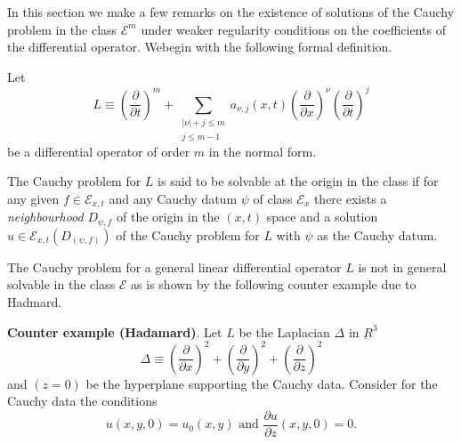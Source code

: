 In this section we make a few remarks on the existence of solutions of
the Cauchy problem in the  class $\mathscr{E}^m$ under weaker
regularity conditions on the coefficients of the differential
operator. We\pageoriginale begin with the following formal definition. 

Let
\begin{equation}
L\equiv \left(\frac{\partial}{\partial t}\right)^m + \sum_{\substack{|\nu |+ j
    \leq m\\ j \leq m-1}}  a_{\nu,  j}(x,  t)\left(\frac{\partial}{\partial
  x}\right)^\nu \left(\frac{\partial}{\partial t}\right)^j
\tag{4.1}\label{chap1-eq4.1}  
\end{equation}
be a differential operator of order $m$ in the normal form. 

\begin{defi*}
The Cauchy problem for $L$ is said to be solvable at the origin in
the class if for any given $f \in \mathscr{E}_{x,  t}$ and any
Cauchy datum $\psi$ of class $\mathscr{E}_x$ there exists a
\textit{neighbourhood} $D_{\psi, f}$ of the origin in the $(x, t)$
space and a solution $u \in \mathscr{E}_{x,  t} (D_{(\psi,
  f)})$ of the Cauchy problem for $L$ with $\psi$ as the Cauchy
datum. 
\end{defi*}

\begin{remark*}
The Cauchy problem for a general linear differential operator $L$ is
not in general solvable in the class $\mathscr{E}$ as is shown by the
following counter example due to Hadmard. 
\end{remark*}

\noindent
\textbf{Counter example (Hadamard)}.
Let $L$ be the Laplacian $\Delta$ in  $\underbar{R}^3$ 
\begin{equation}
\Delta \equiv \left(\frac{\partial}{\partial x}\right)^2 +
\left(\frac{\partial}{\partial y}\right)^2 +
\left(\frac{\partial}{\partial z}\right)^2 \tag{4.2} \label{chap1-eq4.2}
\end{equation}
and $(z = 0)$ be the hyperplane supporting the Cauchy data. Consider
for the Cauchy data the conditions 
$$
u(x,y, 0)=u_0 (x, y)\text{ and } \frac{\partial u}{\partial z} (x,
y,  0) = 0. 
$$


